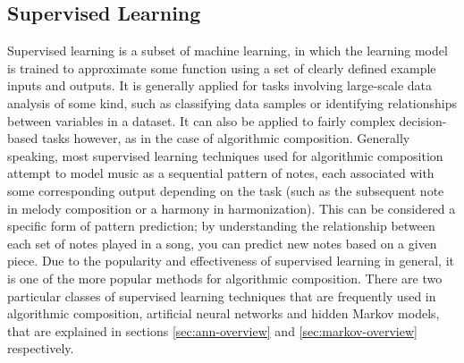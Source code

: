 \documentclass[ author={Stephen Livermore-Tozer},
				supervisor={Dr. Peter Flach},
				degree={MEng},
				title={Algorithmic Co-composition Using Machine Learning},
				subtitle={},
				type={research},
				year={2016} ]{dissertation}
\begin{document}
	\subsection{Supervised Learning}
	\label{sec:supervised-learning}
	
	Supervised learning is a subset of machine learning, in which the learning model is trained to approximate some function using a set of clearly defined example inputs and outputs. It is generally applied for tasks involving large-scale data analysis of some kind, such as classifying data samples or identifying relationships between variables in a dataset. It can also be applied to fairly complex decision-based tasks however, as in the case of algorithmic composition. Generally speaking, most supervised learning techniques used for algorithmic composition attempt to model music as a sequential pattern of notes, each associated with some corresponding output depending on the task (such as the subsequent note in melody composition or a harmony in harmonization). This can be considered a specific form of pattern prediction; by understanding the relationship between each set of notes played in a song, you can predict new notes based on a given piece. Due to the popularity and effectiveness of supervised learning in general, it is one of the more popular methods for algorithmic composition. There are two particular classes of supervised learning techniques that are frequently used in algorithmic composition, artificial neural networks and hidden Markov models, that are explained in sections \ref{sec:ann-overview} and \ref{sec:markov-overview} respectively.
	
\end{document}
